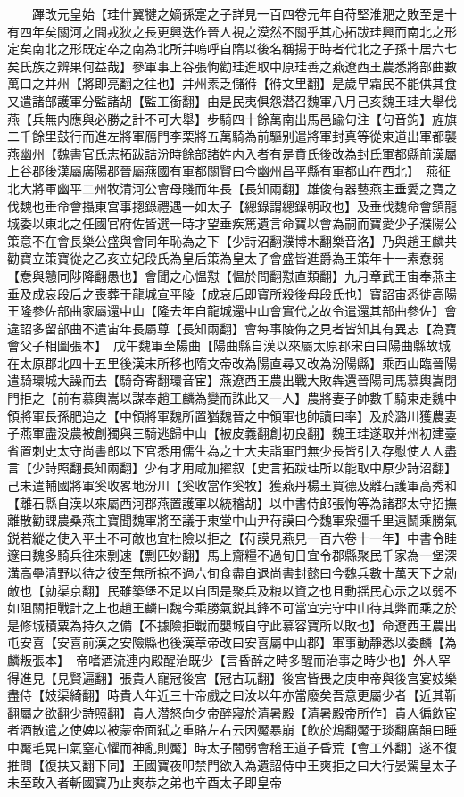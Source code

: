 　　蹕改元皇始【珪什翼犍之嫡孫寔之子詳見一百四卷元年自苻堅淮淝之敗至是十有四年矣關河之間戎狄之長更興迭作晉人視之漠然不關乎其心拓跋珪興而南北之形定矣南北之形既定卒之南為北所并嗚呼自隋以後名稱揚于時者代北之子孫十居六七矣氏族之辨果何益哉】參軍事上谷張恂勸珪進取中原珪善之燕遼西王農悉將部曲數萬口之并州【將即亮翻之往也】并州素乏儲㣥【㣥文里翻】是歲早霜民不能供其食又遣諸部護軍分監諸胡【監工銜翻】由是民夷俱怨潜召魏軍八月己亥魏王珪大舉伐燕【兵無内應與必勝之計不可大舉】步騎四十餘萬南出馬邑踰句注【句音鉤】旌旗二千餘里鼓行而進左將軍鴈門李栗將五萬騎為前驅别遣將軍封真等從東道出軍都襲燕幽州【魏書官氏志拓跋詰汾時餘部諸姓内入者有是賁氏後改為封氏軍都縣前漢屬上谷郡後漢屬廣陽郡晉屬燕國有軍都關賢曰今幽州昌平縣有軍都山在西北】　燕征北大將軍幽平二州牧清河公會母賤而年長【長知兩翻】雄俊有器藝燕主垂愛之寶之伐魏也垂命會攝東宫事摠錄禮遇一如太子【總錄謂總錄朝政也】及垂伐魏命會鎮龍城委以東北之任國官府佐皆選一時才望垂疾篤遺言命寶以會為嗣而寶愛少子濮陽公策意不在會長樂公盛與會同年恥為之下【少詩沼翻濮博木翻樂音洛】乃與趙王麟共勸寶立策寶從之乙亥立妃段氏為皇后策為皇太子會盛皆進爵為王策年十一素憃弱【憃與戇同陟降翻愚也】會聞之心愠懟【愠於問翻懟直類翻】九月章武王宙奉燕主垂及成哀段后之喪葬于龍城宣平陵【成哀后即寶所殺後母段氏也】寶詔宙悉徙高陽王隆參佐部曲家屬還中山【隆去年自龍城還中山會實代之故令遣還其部曲參佐】會違詔多留部曲不遣宙年長屬尊【長知兩翻】會每事陵侮之見者皆知其有異志【為寶會父子相圖張本】　戊午魏軍至陽曲【陽曲縣自漢以來屬太原郡宋白曰陽曲縣故城在太原郡北四十五里後漢末所移也隋文帝改為陽直尋又改為汾陽縣】乘西山臨晉陽遣騎環城大譟而去【騎奇寄翻環音宦】燕遼西王農出戰大敗犇還晉陽司馬慕輿嵩閉門拒之【前有慕輿嵩以謀奉趙王麟為變而誅此又一人】農將妻子帥數千騎東走魏中領將軍長孫肥追之【中領將軍魏所置猶魏晉之中領軍也帥讀曰率】及於潞川獲農妻子燕軍盡没農被創獨與三騎逃歸中山【被皮義翻創初良翻】魏王珪遂取并州初建臺省置刺史太守尚書郎以下官悉用儒生為之士大夫詣軍門無少長皆引入存慰使人人盡言【少詩照翻長知兩翻】少有才用咸加擢叙【史言拓跋珪所以能取中原少詩沼翻】己未遣輔國將軍奚收畧地汾川【奚收當作奚牧】獲燕丹楊王買德及離石護軍高秀和【離石縣自漢以來屬西河郡燕置護軍以統稽胡】以中書侍郎張恂等為諸郡太守招撫離散勸課農桑燕主寶聞魏軍將至議于東堂中山尹苻謨曰今魏軍衆彊千里遠鬭乘勝氣鋭若縱之使入平土不可敵也宜杜險以拒之【苻謨見燕見一百六卷十一年】中書令眭邃曰魏多騎兵往來剽速【剽匹妙翻】馬上齎糧不過旬日宜令郡縣聚民千家為一堡深溝高壘清野以待之彼至無所掠不過六旬食盡自退尚書封懿曰今魏兵數十萬天下之勍敵也【勍渠京翻】民雖築堡不足以自固是聚兵及粮以資之也且動揺民心示之以弱不如阻關拒戰計之上也趙王麟曰魏今乘勝氣鋭其鋒不可當宜完守中山待其弊而乘之於是修城積粟為持久之備【不據險拒戰而嬰城自守此慕容寶所以敗也】命遼西王農出屯安喜【安喜前漢之安險縣也後漢章帝改曰安喜屬中山郡】軍事動靜悉以委麟【為麟叛張本】　帝嗜酒流連内殿醒治既少【言昏醉之時多醒而治事之時少也】外人罕得進見【見賢遍翻】張貴人寵冠後宫【冠古玩翻】後宫皆畏之庚申帝與後宫宴妓樂盡侍【妓渠綺翻】時貴人年近三十帝戲之曰汝以年亦當廢矣吾意更屬少者【近其靳翻屬之欲翻少詩照翻】貴人潜怒向夕帝醉寢於清暑殿【清暑殿帝所作】貴人徧飲宦者酒散遣之使婢以被蒙帝面弑之重賂左右云因魘暴崩【飲於鴆翻魘于琰翻廣韻曰睡中魘毛晃曰氣窒心懼而神亂則魘】時太子闇弱會稽王道子昏荒【會工外翻】遂不復推問【復扶又翻下同】王國寶夜叩禁門欲入為遺詔侍中王爽拒之曰大行晏駕皇太子未至敢入者斬國寶乃止爽恭之弟也辛酉太子即皇帝